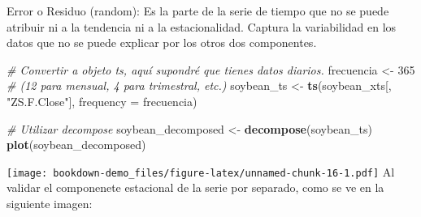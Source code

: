 \documentclass[
]{book}
\newenvironment{Shaded}{\begin{snugshade}}{\end{snugshade}}
\newcommand{\AttributeTok}[1]{\textcolor[rgb]{0.13,0.29,0.53}{#1}}
\newcommand{\CommentTok}[1]{\textcolor[rgb]{0.56,0.35,0.01}{\textit{#1}}}
\newcommand{\DecValTok}[1]{\textcolor[rgb]{0.00,0.00,0.81}{#1}}
\newcommand{\FunctionTok}[1]{\textcolor[rgb]{0.13,0.29,0.53}{\textbf{#1}}}
\newcommand{\NormalTok}[1]{#1}
\newcommand{\OtherTok}[1]{\textcolor[rgb]{0.56,0.35,0.01}{#1}}
\newcommand{\SpecialCharTok}[1]{\textcolor[rgb]{0.81,0.36,0.00}{\textbf{#1}}}
\newcommand{\StringTok}[1]{\textcolor[rgb]{0.31,0.60,0.02}{#1}}
\begin{document}
Error o Residuo (random): Es la parte de la serie de tiempo que no se puede atribuir ni a la tendencia ni a la estacionalidad. Captura la variabilidad en los datos que no se puede explicar por los otros dos componentes.

\begin{Shaded}
\begin{Highlighting}[]
\CommentTok{\# Convertir a objeto ts, aquí supondré que tienes datos diarios.}
\NormalTok{frecuencia }\OtherTok{\textless{}{-}} \DecValTok{365}  \CommentTok{\# (12 para mensual, 4 para trimestral, etc.)}
\NormalTok{soybean\_ts }\OtherTok{\textless{}{-}} \FunctionTok{ts}\NormalTok{(soybean\_xts[, }\StringTok{"ZS.F.Close"}\NormalTok{], }
\AttributeTok{frequency =}\NormalTok{ frecuencia)}

\CommentTok{\# Utilizar decompose}
\NormalTok{soybean\_decomposed }\OtherTok{\textless{}{-}} \FunctionTok{decompose}\NormalTok{(soybean\_ts)}
\FunctionTok{plot}\NormalTok{(soybean\_decomposed)}
\end{Highlighting}
\end{Shaded}

\texttt{[image: bookdown-demo\_files/figure-latex/unnamed-chunk-16-1.pdf]}
Al validar el componenete estacional de la serie por separado, como se ve en la siguiente imagen:

\begin{Shaded}
\end{Shaded}
\end{document}

